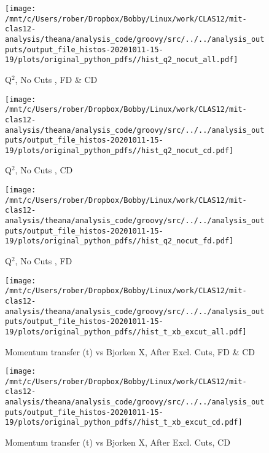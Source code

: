 \documentclass{article}
\begin{document}
\begin{landscape}
    \begin{figure}[h]
        \centering

        \texttt{[image: /mnt/c/Users/rober/Dropbox/Bobby/Linux/work/CLAS12/mit-clas12-analysis/theana/analysis\_code/groovy/src/../../analysis\_outputs/output\_file\_histos-20201011-15-19/plots/original\_python\_pdfs//hist\_q2\_nocut\_all.pdf]}
        \captionsetup{textformat=empty,labelformat=blank}
        \caption{Q$^{2}$, No Cuts , FD \& CD}
    \end{figure}
    \clearpage
    
    \begin{figure}[h]
        \centering

        \texttt{[image: /mnt/c/Users/rober/Dropbox/Bobby/Linux/work/CLAS12/mit-clas12-analysis/theana/analysis\_code/groovy/src/../../analysis\_outputs/output\_file\_histos-20201011-15-19/plots/original\_python\_pdfs//hist\_q2\_nocut\_cd.pdf]}
        \captionsetup{textformat=empty,labelformat=blank}
        \caption{Q$^{2}$, No Cuts , CD}
    \end{figure}
    \clearpage
    
    \begin{figure}[h]
        \centering

        \texttt{[image: /mnt/c/Users/rober/Dropbox/Bobby/Linux/work/CLAS12/mit-clas12-analysis/theana/analysis\_code/groovy/src/../../analysis\_outputs/output\_file\_histos-20201011-15-19/plots/original\_python\_pdfs//hist\_q2\_nocut\_fd.pdf]}
        \captionsetup{textformat=empty,labelformat=blank}
        \caption{Q$^{2}$, No Cuts , FD}
    \end{figure}
    \clearpage
    
    \begin{figure}[h]
        \centering

        \texttt{[image: /mnt/c/Users/rober/Dropbox/Bobby/Linux/work/CLAS12/mit-clas12-analysis/theana/analysis\_code/groovy/src/../../analysis\_outputs/output\_file\_histos-20201011-15-19/plots/original\_python\_pdfs//hist\_t\_xb\_excut\_all.pdf]}
        \captionsetup{textformat=empty,labelformat=blank}
        \caption{Momentum transfer (t) vs Bjorken X, After Excl. Cuts, FD \& CD}
    \end{figure}
    \clearpage
    
    \begin{figure}[h]
        \centering

        \texttt{[image: /mnt/c/Users/rober/Dropbox/Bobby/Linux/work/CLAS12/mit-clas12-analysis/theana/analysis\_code/groovy/src/../../analysis\_outputs/output\_file\_histos-20201011-15-19/plots/original\_python\_pdfs//hist\_t\_xb\_excut\_cd.pdf]}
        \captionsetup{textformat=empty,labelformat=blank}
        \caption{Momentum transfer (t) vs Bjorken X, After Excl. Cuts, CD}
    \end{figure}
    \clearpage
    

\end{landscape}
\end{document}
